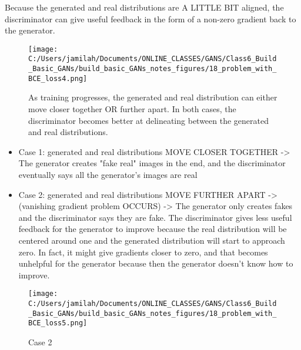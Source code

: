 \documentclass[11pt, onecolumn]{article}
\begin{document}
\begin{itemize}
Because the generated and real distributions are A LITTLE BIT aligned, the discriminator can give useful feedback in
the form of a non-zero gradient back to the generator.

\begin{figure}[htp]
\begin{center}
\texttt{[image: C:/Users/jamilah/Documents/ONLINE\_CLASSES/GANS/Class6\_Build\_Basic\_GANs/build\_basic\_GANs\_notes\_figures/18\_problem\_with\_BCE\_loss4.png]}
\end{center}
\caption{As training progresses, the generated and real distribution can either move closer together OR further apart.  In both cases, the discriminator becomes better at delineating between the generated and real distributions.}
\label{18_problem_with_BCE_loss4}
\end{figure}

\begin{itemize}
\item Case 1: generated and real distributions MOVE CLOSER TOGETHER -> The generator creates "fake real" images in the end, and the discriminator eventually says all the generator's images are real
\item Case 2: generated and real distributions MOVE FURTHER APART -> (vanishing gradient problem OCCURS) -> The generator only creates fakes and the discriminator says they are fake. The discriminator gives less useful feedback for the generator to improve because the real distribution will be centered around one and the generated distribution will start to approach zero. In fact, it might give gradients closer to zero, and that becomes unhelpful for the generator because then the generator doesn't know how to improve.
\end{itemize}

\begin{figure}[htp]
\begin{center}
\texttt{[image: C:/Users/jamilah/Documents/ONLINE\_CLASSES/GANS/Class6\_Build\_Basic\_GANs/build\_basic\_GANs\_notes\_figures/18\_problem\_with\_BCE\_loss5.png]}
\end{center}
\caption{Case 2}
\label{18_problem_with_BCE_loss5}
\end{figure}


\end{itemize}
\end{document}
